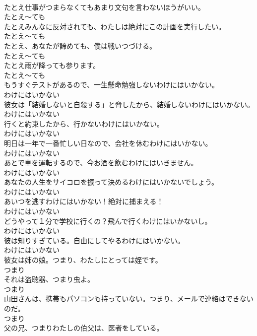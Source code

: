 \documentclass[8pt]{extreport}
\begin{document}
\begin{CJK}{UTF8}{min}
\\	たとえ仕事がつまらなくてもあまり文句を言わないほうがいい。	
\\	たとえ～ても	
\\	たとえみんなに反対されても、わたしは絶対にこの計画を実行したい。	
\\	たとえ～ても	
\\	たとえ、あなたが諦めても、僕は戦いつづける。	
\\	たとえ～ても	
\\	たとえ雨が降っても参ります。	
\\	たとえ～ても	
\\	もうすぐテストがあるので、一生懸命勉強しないわけにはいかない。	
\\	わけにはいかない	
\\	彼女は「結婚しないと自殺する」と脅したから、結婚しないわけにはいかない。	
\\	わけにはいかない	
\\	行くと約束したから、行かないわけにはいかない。	
\\	わけにはいかない	
\\	明日は一年で一番忙しい日なので、会社を休むわけにはいかない。	
\\	わけにはいかない	
\\	あとで車を運転するので、今お酒を飲むわけにはいきません。	
\\	わけにはいかない	
\\	あなたの人生をサイコロを振って決めるわけにはいかないでしょう。	
\\	わけにはいかない	
\\	あいつを逃すわけにはいかない！絶対に捕まえる！	
\\	わけにはいかない	
\\	どうやって１分で学校に行くの？飛んで行くわけにはいかないし。	
\\	わけにはいかない	
\\	彼は知りすぎている。自由にしてやるわけにはいかない。	
\\	わけにはいかない	
\\	彼女は姉の娘。つまり、わたしにとっては姪です。	
\\	つまり	
\\	それは盗聴器、つまり虫よ。	
\\	つまり	
\\	山田さんは、携帯もパソコンも持っていない。つまり、メールで連絡はできないのだ。	
\\	つまり	
\\	父の兄、つまりわたしの伯父は、医者をしている。	

\end{CJK}
\end{document}
